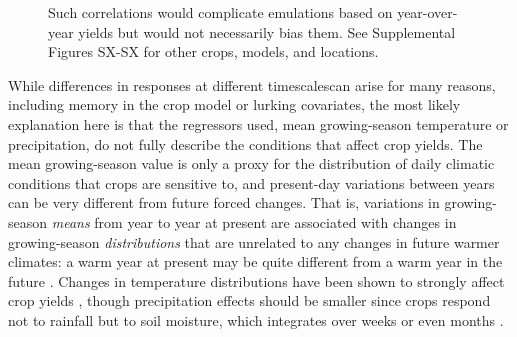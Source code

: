 \documentclass[gmd, manuscript]{copernicus} %
\begin{document}
\begin{figure}[ht]
{   Such correlations would complicate emulations based on year-over-year yields but would not necessarily bias them.
   See Supplemental Figures SX-SX for other crops, models, and locations.
   }
   \label{fig:yearvclim}
\end{figure}

While differences in responses at different timescalescan arise for many reasons, including memory in the crop model or lurking covariates, the most likely explanation here is that the regressors used, mean growing-season temperature or precipitation, do not fully describe the conditions that affect crop yields. 
The mean growing-season value is only a proxy for the distribution of daily climatic conditions that crops are sensitive to, and present-day variations between years can be very different from future forced changes. 
That is, variations in growing-season \textit{means} from year to year at present are associated with changes in growing-season \textit{distributions} that are unrelated to any changes in future warmer climates: a warm year at present may be quite different from a warm year in the future \citep[e.g.][]{Ruane2016}. %
Changes in temperature distributions have been shown to strongly affect crop yields \citep[e.g.][]{Hansen2000, Gadgil2002}, though precipitation effects should be smaller since crops respond not to rainfall but to soil moisture, which integrates over weeks or even months \citep[e.g.][]{potter2005effects, Glotter14, CHALLINOR200499}. 
\end{document}
